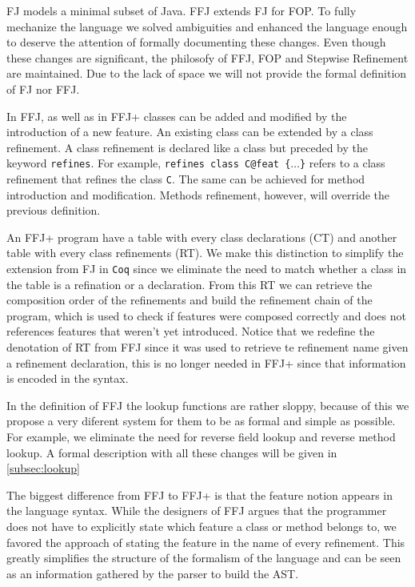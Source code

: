 \ac{FJ} models a minimal subset of Java. \ac{FFJ} extends \ac{FJ} for \ac{FOP}.
To fully mechanize the language we solved ambiguities and enhanced the language enough
to deserve the attention of formally documenting these changes. 
Even though these changes are significant, the philosofy of \ac{FFJ}, \ac{FOP} and Stepwise Refinement are maintained.
Due to the lack of space we will not provide the formal definition of \ac{FJ} nor \ac{FFJ}.

In \ac{FFJ}, as well as in \ac{FFJ+} classes can be added and modified by the introduction of a new feature.
An existing class can be extended by a class refinement. A class refinement is declared like a class but
preceded by the keyword \texttt{refines}. For example, \texttt{refines class C@feat \{$\dots$\}} refers to a class refinement that
refines the class \texttt{C}. The same can be achieved for method introduction and modification. Methods refinement,
however, will override the previous definition.

An \ac{FFJ+} program have a table with every class declarations (\textsf{CT}) and another table with every class refinements (\textsf{RT}).
We make this distinction to simplify the extension from \ac{FJ} in \texttt{Coq} since we eliminate the need
to match whether a class in the table is a refination or a declaration. From this \textsf{RT} we can retrieve the composition order
of the refinements and build the refinement chain of the program, which is used to check if features were composed correctly and
does not references features that weren't yet introduced. Notice that we redefine the denotation of \textsf{RT} from \ac{FFJ}
since it was used to retrieve te refinement name given a refinement declaration, this is no longer needed in \ac{FFJ+} since
that information is encoded in the syntax.

In the definition of \ac{FFJ} the lookup functions are rather sloppy, because of this we propose a very diferent system
for them to be as formal and simple as possible. For example, we eliminate the need for reverse field lookup and 
reverse method lookup. A formal description with all these changes will be given in \ref{subsec:lookup}


The biggest difference from \ac{FFJ} to \ac{FFJ+} is that the feature notion appears in the language syntax.
While the designers of \ac{FFJ} argues that the programmer does not have to explicitly state which
feature a class or method belongs to, we favored the approach of stating the feature in the name of every refinement.
This greatly simplifies the structure of the formalism of the language and can be seen as an information gathered
by the parser to build the AST.

